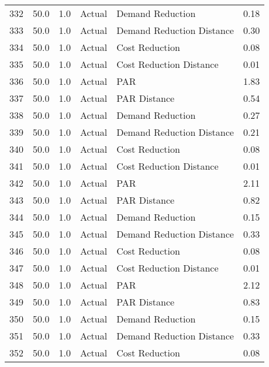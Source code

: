 \begin{longtable}{lrrllr}
332  &         50.0 &     1.0 &         Actual &           Demand Reduction &   0.18 \\
333  &         50.0 &     1.0 &         Actual &  Demand Reduction Distance &   0.30 \\
334  &         50.0 &     1.0 &         Actual &             Cost Reduction &   0.08 \\
335  &         50.0 &     1.0 &         Actual &    Cost Reduction Distance &   0.01 \\
336  &         50.0 &     1.0 &         Actual &                        PAR &   1.83 \\
337  &         50.0 &     1.0 &         Actual &               PAR Distance &   0.54 \\
338  &         50.0 &     1.0 &         Actual &           Demand Reduction &   0.27 \\
339  &         50.0 &     1.0 &         Actual &  Demand Reduction Distance &   0.21 \\
340  &         50.0 &     1.0 &         Actual &             Cost Reduction &   0.08 \\
341  &         50.0 &     1.0 &         Actual &    Cost Reduction Distance &   0.01 \\
342  &         50.0 &     1.0 &         Actual &                        PAR &   2.11 \\
343  &         50.0 &     1.0 &         Actual &               PAR Distance &   0.82 \\
344  &         50.0 &     1.0 &         Actual &           Demand Reduction &   0.15 \\
345  &         50.0 &     1.0 &         Actual &  Demand Reduction Distance &   0.33 \\
346  &         50.0 &     1.0 &         Actual &             Cost Reduction &   0.08 \\
347  &         50.0 &     1.0 &         Actual &    Cost Reduction Distance &   0.01 \\
348  &         50.0 &     1.0 &         Actual &                        PAR &   2.12 \\
349  &         50.0 &     1.0 &         Actual &               PAR Distance &   0.83 \\
350  &         50.0 &     1.0 &         Actual &           Demand Reduction &   0.15 \\
351  &         50.0 &     1.0 &         Actual &  Demand Reduction Distance &   0.33 \\
352  &         50.0 &     1.0 &         Actual &             Cost Reduction &   0.08 \\

\end{longtable}
